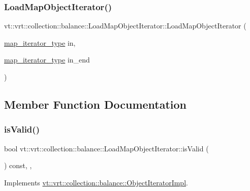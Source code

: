 \subsubsection{\texorpdfstring{Load\+Map\+Object\+Iterator()}{LoadMapObjectIterator()}}
{\footnotesize\ttfamily vt\+::vrt\+::collection\+::balance\+::\+Load\+Map\+Object\+Iterator\+::\+Load\+Map\+Object\+Iterator (\begin{DoxyParamCaption}\item[{\hyperlink{structvt_1_1vrt_1_1collection_1_1balance_1_1_load_map_object_iterator_ae487f542c8875bc4cd60da54da5545ce}{map\+\_\+iterator\+\_\+type}}]{in,  }\item[{\hyperlink{structvt_1_1vrt_1_1collection_1_1balance_1_1_load_map_object_iterator_ae487f542c8875bc4cd60da54da5545ce}{map\+\_\+iterator\+\_\+type}}]{in\+\_\+end }\end{DoxyParamCaption})\hspace{0.3cm}{\ttfamily [inline]}}



\subsection{Member Function Documentation}
\mbox{\label{structvt_1_1vrt_1_1collection_1_1balance_1_1_load_map_object_iterator_a42b545ead5d94d4a07478977d70567da}} 
\subsubsection{\texorpdfstring{is\+Valid()}{isValid()}}
{\footnotesize\ttfamily bool vt\+::vrt\+::collection\+::balance\+::\+Load\+Map\+Object\+Iterator\+::is\+Valid (\begin{DoxyParamCaption}{ }\end{DoxyParamCaption}) const\hspace{0.3cm}{\ttfamily [inline]}, {\ttfamily [override]}, {\ttfamily [virtual]}}



Implements \hyperlink{structvt_1_1vrt_1_1collection_1_1balance_1_1_object_iterator_impl_a16b8504d1abff325f65ce29513792386}{vt\+::vrt\+::collection\+::balance\+::\+Object\+Iterator\+Impl}.

